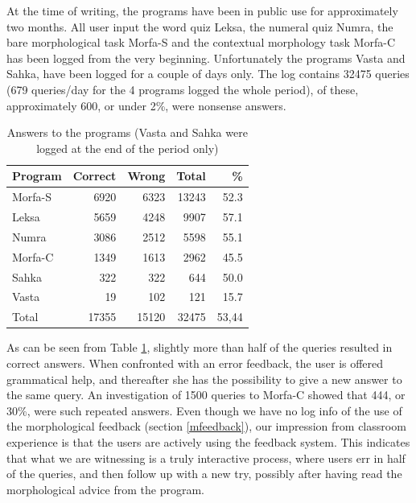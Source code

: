\documentclass[11pt]{article}
\begin{document}
At the time of writing, the programs have been in public use for approximately two months. %
All user input the word quiz Leksa, the numeral quiz Numra, the bare morphological task Morfa-S and the contextual morphology task Morfa-C has been logged from the very beginning. Unfortunately the programs Vasta and Sahka, have been logged for a couple of days only. The log contains 32475 queries (679 queries/day for the 4 programs logged the whole period), of these, approximately 600, or under 2\%, were nonsense answers. 

\begin{table}[htdp]
\caption{Answers to the programs (Vasta and Sahka were logged at the end of the period only)}
\begin{center}
\begin{tabular}{|l|r|r|r|r|}
\hline
Program     & Correct &   Wrong &    Total &  \% \\
\hline									 
Morfa-S  &  6920   & 6323    & 13243    & 52.3 \\
Leksa    &  5659   & 4248    & 9907	    & 57.1  \\
Numra    &  3086   & 2512    & 5598	    & 55.1  \\
Morfa-C  &  1349   & 1613    & 2962	    & 45.5  \\
Sahka    &   322   &   322   &  644	    & 50.0  \\
Vasta    &   19    &   102   &  121	    & 15.7 \\
\hline
Total   & 17355  &  15120  &  32475  &  53,44\\
\hline
\end{tabular}
\end{center}
\label{log1}
\end{table}


As can be seen from Table \ref{log1}, slightly more than half of the queries resulted in correct answers. When confronted with an error feedback, the user is offered grammatical help, and thereafter she has the possibility to give a new answer to the same query. An investigation of 1500 queries to Morfa-C showed that 444, or 30\%, were such repeated answers. Even though we have no log info of the use of the morphological feedback (section \ref{mfeedback}), our impression from classroom experience is that the users are actively using the feedback system. This indicates that what we are witnessing is a truly interactive process, where users err in half of the queries, and then follow up with a new try, possibly after having read the morphological advice from the program.
\end{document}

